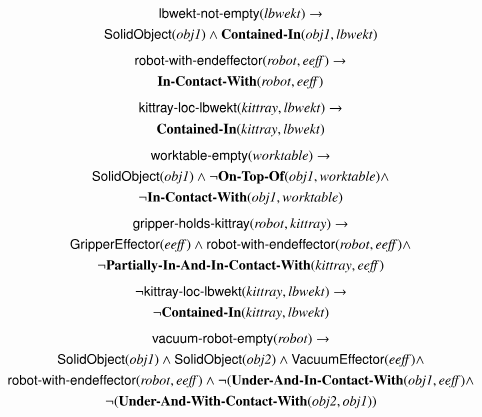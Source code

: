 \documentclass[final,1p,times]{elsarticle}
\newcommand{\class}[1] {\textsf{#1}}
\newcommand{\stvar}[1] {\textsf{#1}}
\begin{document}
\begin{gather}
\label{eq:lbwekt-not-empty}
\stvar{lbwekt-not-empty}(\mathit{lbwekt}) \rightarrow \\
\class{SolidObject}(\textit{obj1}) \wedge \textbf{Contained-In}(\textit{obj1}, \mathit{lbwekt}) \notag
\end{gather}
\begin{gather}
\label{eq:robot-with-endeffector}
\stvar{robot-with-endeffector}(\mathit{robot},\mathit{eeff}) \rightarrow \\
\textbf{In-Contact-With}(\mathit{robot},\mathit{eeff}) \notag
\end{gather}
\begin{gather}
\label{eq:kittray-loc-lbwekt}
\stvar{kittray-loc-lbwekt}(\mathit{kittray},\mathit{lbwekt}) \rightarrow \\
\textbf{Contained-In}(\mathit{kittray},\mathit{lbwekt}) \notag
\end{gather}
\begin{gather}
\label{eq:worktable-empty}
\stvar{worktable-empty}(\mathit{worktable}) \rightarrow \\
\class{SolidObject}(\textit{obj1}) \wedge \neg\textbf{On-Top-Of}(\textit{obj1}, \mathit{worktable}) \wedge \notag\\
\neg \textbf{In-Contact-With}(\textit{obj1}, \mathit{worktable})\notag
\end{gather}
\begin{gather}
\label{eq:gripper-holds-kittray}
\stvar{gripper-holds-kittray}(\mathit{robot},\mathit{kittray}) \rightarrow \\
\class{GripperEffector}(\mathit{eeff}) \wedge \stvar{robot-with-endeffector}(\mathit{robot},\mathit{eeff}) \wedge \notag\\
\neg \textbf{Partially-In-And-In-Contact-With}(\mathit{kittray}, \mathit{eeff})\notag
\end{gather}
\begin{gather}
\label{eq:neg-kittray-loc-lbwekt}
\neg \stvar{kittray-loc-lbwekt}(\mathit{kittray},\mathit{lbwekt}) \rightarrow\\
\neg \textbf{Contained-In}(\mathit{kittray},\mathit{lbwekt}) \notag
\end{gather}
\begin{gather}
\label{eq:vacuum-robot-empty}
\stvar{vacuum-robot-empty}(\mathit{robot}) \rightarrow \\
\class{SolidObject}(\mathit{obj1}) \wedge \class{SolidObject}(\mathit{obj2}) \wedge \class{VacuumEffector}(\mathit{eeff}) \wedge\notag\\
\stvar{robot-with-endeffector}(\mathit{robot},\mathit{eeff}) \wedge \neg (\textbf{Under-And-In-Contact-With}(\mathit{obj1},\mathit{eeff}) \wedge \notag\\
\neg (\textbf{Under-And-With-Contact-With}(\mathit{obj2},\mathit{obj1}))\notag
\end{gather}
\end{document}

